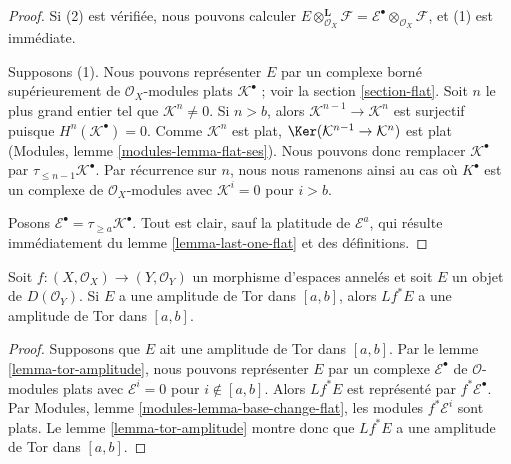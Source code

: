 {\begin{lemma}
\end{lemma}

\begin{proof}
Si (2) est vérifiée, nous pouvons calculer $E \otimes_{\mathcal{O}_X}^\mathbf{L} \mathcal{F} =
\mathcal{E}^\bullet \otimes_{\mathcal{O}_X} \mathcal{F}$, et (1) est immédiate.

\medskip\noindent

Supposons (1). Nous pouvons représenter $E$ par un complexe borné supérieurement de $\mathcal{O}_X$-modules plats $\mathcal{K}^\bullet$ ; voir la section \ref{section-flat}. Soit $n$ le plus grand entier tel que $\mathcal{K}^n \not = 0$. Si $n > b$, alors $\mathcal{K}^{n - 1} \to \mathcal{K}^n$ est surjectif puisque
$H^n(\mathcal{K}^\bullet) = 0$. Comme $\mathcal{K}^n$ est plat,
$\Ker(\mathcal{K}^{n - 1} \to \mathcal{K}^n)$ est plat (Modules, lemme \ref{modules-lemma-flat-ses}). Nous pouvons donc remplacer $\mathcal{K}^\bullet$ par
$\tau_{\leq n - 1}\mathcal{K}^\bullet$. Par récurrence sur $n$, nous nous ramenons ainsi au cas où $K^\bullet$ est un complexe de
$\mathcal{O}_X$-modules avec $\mathcal{K}^i = 0$ pour $i > b$.

\medskip\noindent

Posons $\mathcal{E}^\bullet = \tau_{\geq a}\mathcal{K}^\bullet$. Tout est clair, sauf la platitude de $\mathcal{E}^a$, qui résulte immédiatement du lemme \ref{lemma-last-one-flat}
et des définitions.

\end{proof}

\begin{lemma}

\label{lemma-tor-amplitude-pullback}
Soit $f : (X, \mathcal{O}_X) \to (Y, \mathcal{O}_Y)$ un morphisme d'espaces annelés et soit $E$ un objet de $D(\mathcal{O}_Y)$. Si $E$ a une amplitude de Tor dans $[a, b]$, alors $Lf^*E$ a une amplitude de Tor dans $[a, b]$.
\end{lemma}

\begin{proof}
Supposons que $E$ ait une amplitude de Tor dans $[a, b]$. Par le lemme \ref{lemma-tor-amplitude}, nous pouvons représenter $E$ par un complexe $\mathcal{E}^\bullet$ de $\mathcal{O}$-modules plats avec $\mathcal{E}^i = 0$ pour $i \not \in [a, b]$. Alors $Lf^*E$ est représenté par $f^*\mathcal{E}^\bullet$. Par Modules, lemme \ref{modules-lemma-base-change-flat}, les modules $f^*\mathcal{E}^i$ sont plats. Le lemme \ref{lemma-tor-amplitude} montre donc que $Lf^*E$ a une amplitude de Tor dans $[a, b]$.
\end{proof}

}
